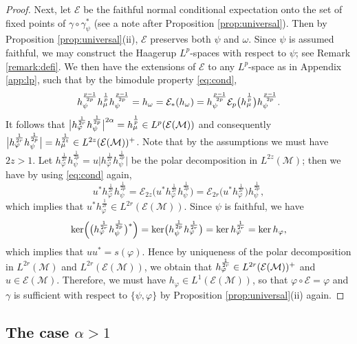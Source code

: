 \documentclass[12pt]{article}
\theoremstyle{definition}
\theoremstyle{remark}
\numberwithin{equation}{section}
\def\cE{\mathcal E}
\def\Me{\mathcal M}
\def\ffi{\varphi}
\begin{document}
\begin{proof}
Next, let $\mathcal E$ be the faithful  normal conditional expectation onto the
set of fixed points of $\gamma\circ\gamma^*_\psi$ (see a note after Proposition \ref{prop:universal}). Then
by Proposition \ref{prop:universal}(ii), $\mathcal E$ preserves both $\psi$ and $\omega$.
Since $\psi$ is assumed faithful, we may construct the Haagerup $L^p$-spaces with respect
to $\psi$; see Remark \ref{remark:defi}. We then have the extensions of $\cE$ to any
$L^p$-space as in Appendix \ref{app:lp}, such that  by the bimodule property
\eqref{eq:cond}, 
\[
h_\psi^{p-1\over 2p}h_\mu^{\frac1p}h_\psi^{p-1\over 2p}=h_\omega=\mathcal
E_*(h_\omega)=h_\psi^{p-1\over 2p}\cE_p\bigl(h_\mu^{\frac1p}\bigr)h_\psi^{p-1\over 2p}.
\]
It follows that $\big|h_\ffi^{1\over 2r}h_\psi^{1\over 2p}\big|^{2\alpha}= h_\mu^{\frac1p}\in
L^p(\cE(\Me))$ and consequently $\big|h_\varphi^{\frac1{2r}}h_\psi^{\frac1{2p}}\big|=h_\mu^{1\over
2z}\in L^{2z}(\mathcal E(\Me))^+$. Note that by the  assumptions we must have $2z>1$. 
Let  $h_\varphi^{\frac1{2r}}h_\psi^{\frac1{2p}}=u\big|h_\varphi^{\frac1{2r}}h_\psi^{\frac1{2p}}\big|$ be the
polar decomposition in $L^{2z}(\Me)$; then we have by using \eqref{eq:cond} again,
\[
u^*h_\varphi^{\frac1{2r}}h_\psi^{\frac1{2p}}=\mathcal
E_{2z}\bigl(u^*h_\varphi^{\frac1{2r}}h_\psi^{\frac1{2p}}\bigr)=\mathcal
E_{2r}\bigl(u^*h_\varphi^{\frac1{2r}}\bigr)h_\psi^{\frac1{2p}},
\]
which implies that $u^*h_\varphi^{\frac1{2r}}\in L^{2r}(\cE(\Me))$. Since $\psi$ is
faithful, we have
{
\[
\ker\Bigl(\bigl(h_\ffi^{1\over2r}h_\psi^{1\over2p}\bigr)^*\Bigr)
=\ker\bigl(h_\psi^{1\over2p}h_\ffi^{1\over2r}\bigr)
=\ker h_\ffi^{1\over2r}=\ker h_\ffi,
\]
which implies that $uu^*=s(\ffi)$.}
Hence by uniqueness of the polar decomposition in $L^{2r}(\Me)$ and $L^{2r}(\cE(\Me))$,
we obtain that $h_\ffi^{1\over 2r}\in L^{2r}(\cE(\Me))^+$ and $u\in \cE(\Me)$. 
Therefore, we must have $h_\ffi\in L^1(\cE(\Me))$, so that $\ffi\circ\mathcal E=\ffi$ and $\gamma$ is
sufficient with respect to $\{\psi,\varphi\}$ by Proposition \ref{prop:universal}(ii) again.
\end{proof}


\subsection{The case $\alpha>1$}
\end{document}
